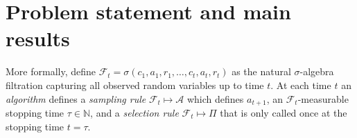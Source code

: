 \documentclass{article}
\newcommand{\mc}[1]{\mathcal{#1}}
\newcommand{\lalit}[1]{\textcolor{blue}{}}
\newcommand{\houssam}[1]{\textcolor{magenta}{HN: #1}}
\newcommand{\1}{\mathbf{1}}
\renewcommand{\v}{r} %
\begin{document}
\begin{enumerate}[wide, labelwidth=0pt, labelindent=0pt]
\end{enumerate}

\section{Problem statement and main results}\label{sec:results}
More formally, define $\mc{F}_t = \sigma(c_1,a_1,r_1,\dots,c_t,a_t,r_t)$ as the natural $\sigma$-algebra filtration capturing all observed random variables up to time $t$. 
At each time $t$ an \textit{algorithm} defines a \emph{sampling rule} $\mc{F}_t \mapsto \mc{A}$ which defines $a_{t+1}$, an $\mc{F}_t$-measurable stopping time $\tau \in \mathbb{N}$, and a \emph{selection rule} $\mc{F}_t \mapsto \Pi$ that is only called once at the stopping time $t=\tau$.
\end{document}
